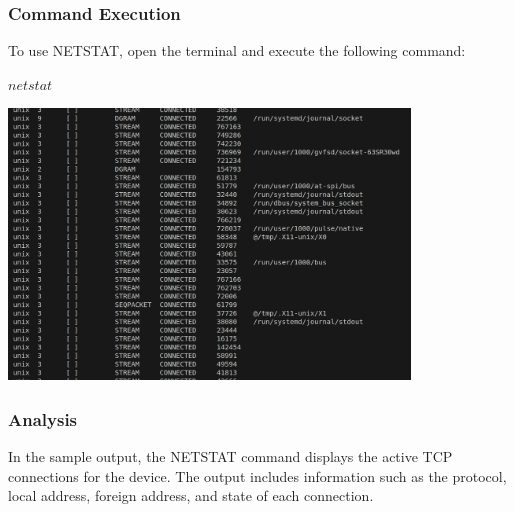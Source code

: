 \documentclass[12pt]{article}
\begin{document}
\subsubsection*{Command Execution}

To use NETSTAT, open the terminal and execute the following command:


$netstat$

\includegraphics[width=0.8\textwidth]{netstat.png}\par\vspace{1cm}

\subsubsection*{Analysis}
In the sample output, the NETSTAT command displays the active TCP connections for the device. The output includes information such as the protocol, local address, foreign address, and state of each connection.
\end{document}
